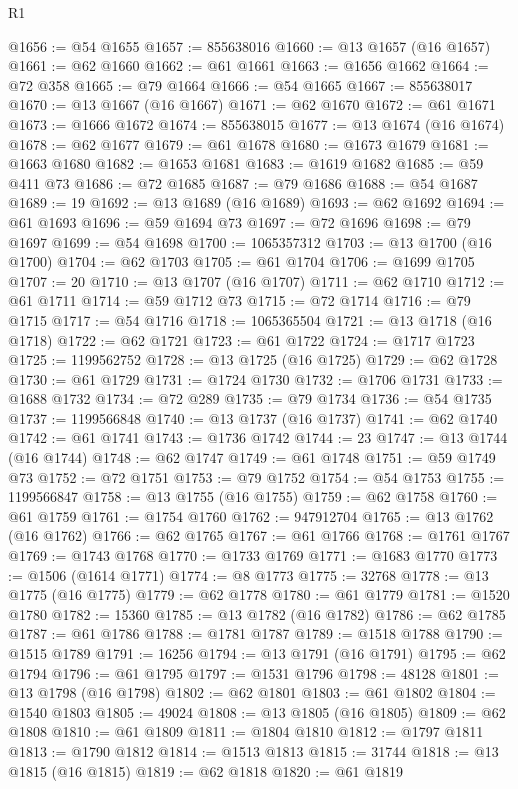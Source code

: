 \begin{lexlean}{R1}
\begin{coremodule}
@1656 := @54 @1655
@1657 := 855638016
@1660 := @13 @1657 (@16 @1657)
@1661 := @62 @1660
@1662 := @61 @1661
@1663 := @1656 @1662
@1664 := @72 @358
@1665 := @79 @1664
@1666 := @54 @1665
@1667 := 855638017
@1670 := @13 @1667 (@16 @1667)
@1671 := @62 @1670
@1672 := @61 @1671
@1673 := @1666 @1672
@1674 := 855638015
@1677 := @13 @1674 (@16 @1674)
@1678 := @62 @1677
@1679 := @61 @1678
@1680 := @1673 @1679
@1681 := @1663 @1680
@1682 := @1653 @1681
@1683 := @1619 @1682
@1685 := @59 @411 @73
@1686 := @72 @1685
@1687 := @79 @1686
@1688 := @54 @1687
@1689 := 19
@1692 := @13 @1689 (@16 @1689)
@1693 := @62 @1692
@1694 := @61 @1693
@1696 := @59 @1694 @73
@1697 := @72 @1696
@1698 := @79 @1697
@1699 := @54 @1698
@1700 := 1065357312
@1703 := @13 @1700 (@16 @1700)
@1704 := @62 @1703
@1705 := @61 @1704
@1706 := @1699 @1705
@1707 := 20
@1710 := @13 @1707 (@16 @1707)
@1711 := @62 @1710
@1712 := @61 @1711
@1714 := @59 @1712 @73
@1715 := @72 @1714
@1716 := @79 @1715
@1717 := @54 @1716
@1718 := 1065365504
@1721 := @13 @1718 (@16 @1718)
@1722 := @62 @1721
@1723 := @61 @1722
@1724 := @1717 @1723
@1725 := 1199562752
@1728 := @13 @1725 (@16 @1725)
@1729 := @62 @1728
@1730 := @61 @1729
@1731 := @1724 @1730
@1732 := @1706 @1731
@1733 := @1688 @1732
@1734 := @72 @289
@1735 := @79 @1734
@1736 := @54 @1735
@1737 := 1199566848
@1740 := @13 @1737 (@16 @1737)
@1741 := @62 @1740
@1742 := @61 @1741
@1743 := @1736 @1742
@1744 := 23
@1747 := @13 @1744 (@16 @1744)
@1748 := @62 @1747
@1749 := @61 @1748
@1751 := @59 @1749 @73
@1752 := @72 @1751
@1753 := @79 @1752
@1754 := @54 @1753
@1755 := 1199566847
@1758 := @13 @1755 (@16 @1755)
@1759 := @62 @1758
@1760 := @61 @1759
@1761 := @1754 @1760
@1762 := 947912704
@1765 := @13 @1762 (@16 @1762)
@1766 := @62 @1765
@1767 := @61 @1766
@1768 := @1761 @1767
@1769 := @1743 @1768
@1770 := @1733 @1769
@1771 := @1683 @1770
@1773 := @1506 (@1614 @1771)
@1774 := @8 @1773
@1775 := 32768
@1778 := @13 @1775 (@16 @1775)
@1779 := @62 @1778
@1780 := @61 @1779
@1781 := @1520 @1780
@1782 := 15360
@1785 := @13 @1782 (@16 @1782)
@1786 := @62 @1785
@1787 := @61 @1786
@1788 := @1781 @1787
@1789 := @1518 @1788
@1790 := @1515 @1789
@1791 := 16256
@1794 := @13 @1791 (@16 @1791)
@1795 := @62 @1794
@1796 := @61 @1795
@1797 := @1531 @1796
@1798 := 48128
@1801 := @13 @1798 (@16 @1798)
@1802 := @62 @1801
@1803 := @61 @1802
@1804 := @1540 @1803
@1805 := 49024
@1808 := @13 @1805 (@16 @1805)
@1809 := @62 @1808
@1810 := @61 @1809
@1811 := @1804 @1810
@1812 := @1797 @1811
@1813 := @1790 @1812
@1814 := @1513 @1813
@1815 := 31744
@1818 := @13 @1815 (@16 @1815)
@1819 := @62 @1818
@1820 := @61 @1819

\end{coremodule}
\end{lexlean}
